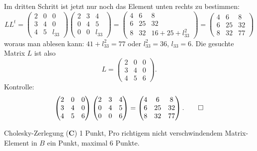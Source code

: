 \begin{loesung}
Im dritten Schritt ist jetzt nur noch das Element unten rechts zu bestimmen:
\[
LL^t=
\begin{pmatrix}
2&0&     0\\
3&4&     0\\
4&5&l_{33}
\end{pmatrix}
\begin{pmatrix}
2&3&     4\\
0&4&     5\\
0&0&l_{33}
\end{pmatrix}
=
\begin{pmatrix}
 4& 6&  8\\
 6&25& 32\\
 8&32&16+25+l_{33}^2
\end{pmatrix}
=
\begin{pmatrix}
 4& 6& 8\\
 6&25&32\\
 8&32&77
\end{pmatrix}
\]
woraus man ablesen kann: $41+l_{33}^2=77$ oder $l_{33}^2=36$, $l_{33}=6$.
Die gesuchte Matrix $L$ ist also
\[
L=
\begin{pmatrix}
2&0&0\\
3&4&0\\
4&5&6
\end{pmatrix}.
\]
Kontrolle:
\[
\begin{pmatrix}
2&0&0\\
3&4&0\\
4&5&6
\end{pmatrix}
\begin{pmatrix}
2&3&4\\
0&4&5\\
0&0&6
\end{pmatrix}
=
\begin{pmatrix}
 4& 6&  8\\
 6&25& 32\\
 8&32& 77
\end{pmatrix}.
\qedhere
\]
\end{loesung}

\begin{bewertung}
Cholesky-Zerlegung ({\bf C}) 1 Punkt,
Pro richtigem nicht verschwindendem Matrix-Element in $B$ ein Punkt,
maximal 6 Punkte.
\end{bewertung}

